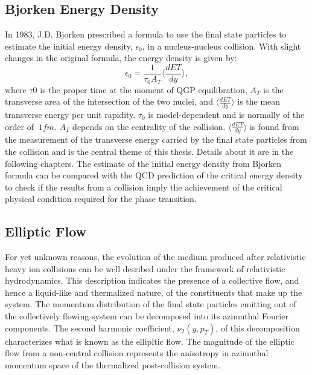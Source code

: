 \subsection{Bjorken Energy Density}
In 1983, J.D. Bjorken\cite{PhysRevD.27.140} prescribed a formula to use the final state particles to estimate the initial energy density, $\epsilon_{0}$, in a nucleus-nucleus collision. With slight changes in the original formula, the energy density is given by:
	\begin{equation}\label{eqn:ebj}
	\epsilon_{0} = \frac{1}{\tau_{0}A_{T}}\langle\frac{dE{T}}{dy}\rangle,
	\end{equation}
where $\tau{0}$ is the proper time at the moment of QGP equilibration, $A_{T}$ is the transverse area of the intersection of the two nuclei, and $\langle\frac{dE{T}}{dy}\rangle$ is the mean transverse energy per unit rapidity. $\tau_{0}$ is model-dependent and is normally of the order of $~1 fm$. $A_{T}$ depends on the centrality of the collision. $\langle\frac{dE{T}}{dy}\rangle$ is found from the measurement of the transverse energy carried by the final state particles from the collision and is the central theme of this thesis. Details about it are in the following chapters.
The estimate of the initial energy density from Bjorken formula can be compared with the QCD prediction of the critical energy density\cite{Adam:2139456} to check if the results from a collision imply the achievement of the critical physical condition required for the phase transition.\cite{2005PrPNP..54..443J}

\subsection{Elliptic Flow}
For yet unknown reasons, the evolution of the medium produced after relativistic heavy ion collisions can be well desribed under the framework of relativistic hydrodynamics. \cite{SCHENKE2017105,2014NuPhA.926...92S} This description indicates the presence of a collective flow, and hence a liquid-like and thermalized nature, of the constituents that make up the system. The momentum distribution of the final state particles emitting out of the collectively flowing system can be decomposed into its azimuthal Fourier components. The second harmonic coefficient, $\nu_{2}(y,p_{T})$, of this decomposition characterizes what is known as the ellipltic flow.\cite{2001PhLB..503...58H} The magnitude of the elliptic flow from a non-central collision represents the anisotropy in azimuthal momentum space of the thermalized post-collision system.\cite{2011NJPh...13e5008S}

